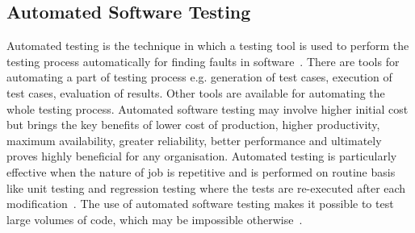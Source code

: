 \subsection{Automated Software Testing}
Automated testing is the technique in which a testing tool is used to perform the testing process automatically for finding faults in software~\cite{leitner2007reconciling}. There are tools for automating a part of testing process e.g. generation of test cases, execution of test cases, evaluation of results. Other tools are available for automating the whole testing process. 
Automated software testing may involve higher initial cost but brings the key benefits of lower cost of production, higher productivity, maximum availability, greater reliability, better performance and ultimately proves highly beneficial for any organisation. Automated testing is particularly effective when the nature of job is repetitive and is performed on routine basis like unit testing and regression testing where the tests are re-executed after each modification~\cite{huang2003automated}. The use of automated software testing makes it possible to test large volumes of code, which may be impossible otherwise~\cite{ramamoorthy1975testing}.

